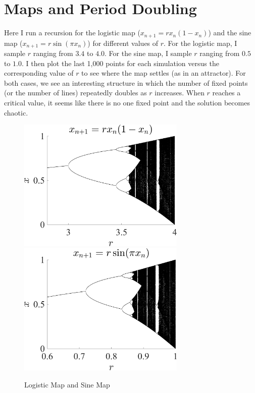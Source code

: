 \documentclass[11pt]{article}
\begin{document}
\clearpage
\section*{Maps and Period Doubling}
Here I run a recursion for the logistic map ($x_{n+1} = rx_n(1-x_n)$) and the sine map ($x_{n+1} = r\sin(\pi x_n)$) for different values of $r$. For the logistic map, I sample $r$ ranging from $3.4$ to $4.0$. For the sine map, I sample $r$ ranging from $0.5$ to $1.0$. I then plot the last 1,000 points for each simulation versus the corresponding value of $r$ to see where the map settles (as in an attractor). For both cases, we see an interesting structure in which the number of fixed points (or the number of lines) repeatedly doubles as $r$ increases. When $r$ reaches a critical value, it seems like there is no one fixed point and the solution becomes chaotic. 
\begin{figure}[h]
\centering
\includegraphics[width=8cm]{Logistic_map.png}
\includegraphics[width=8cm]{Sine_mapM.png}
\caption{Logistic Map and Sine Map}
\end{figure}
\end{document}
